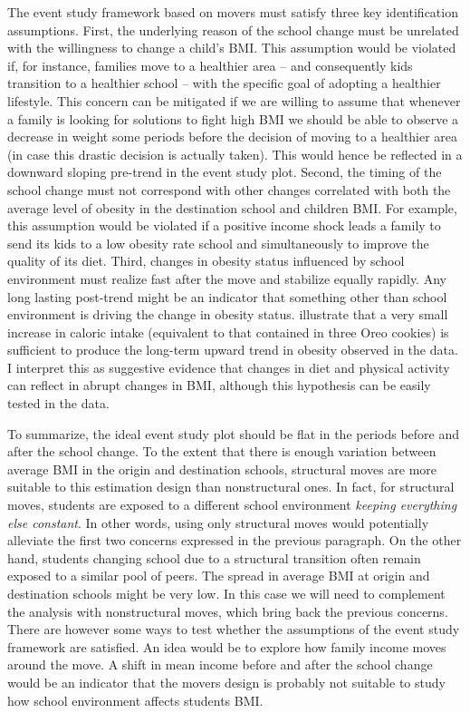 \documentclass[twoside,12pt]{article}
\begin{document}
The event study framework based on movers must satisfy three key identification assumptions. First, the underlying reason of the school change must be unrelated with the willingness to change a child's BMI. This assumption would be violated if, for instance, families move to a healthier area -- and consequently kids transition to a healthier school -- with the specific goal of adopting a healthier lifestyle. This concern can be mitigated if we are willing to assume that whenever a family is looking for solutions to fight high BMI we should be able to observe a decrease in weight some periods before the decision of moving to a healthier area (in case this drastic decision is actually taken). This would hence be reflected in a downward sloping pre-trend in the event study plot. Second, the timing of the school change must not correspond with other changes correlated with both the average level of obesity in the destination school and children BMI. For example, this assumption would be violated if a positive income shock leads a family to send its kids to a low obesity rate school and simultaneously to improve the quality of its diet. Third, changes in obesity status influenced by school environment must realize fast after the move and stabilize equally rapidly. Any long lasting post-trend might be an indicator that something other than school environment is driving the change in obesity status. \cite{cutler2002have} illustrate that a very small increase in caloric intake (equivalent to that contained in three Oreo cookies) is sufficient to produce the long-term upward trend in obesity observed in the data. I interpret this as suggestive evidence that changes in diet and physical activity can reflect in abrupt changes in BMI, although this hypothesis can be easily tested in the data. 

To summarize, the ideal event study plot should be flat in the periods before and after the school change. To the extent that there is enough variation between average BMI in the origin and destination schools, structural moves are more suitable to this estimation design than nonstructural ones. In fact, for structural moves, students are exposed to a different school environment \textit{keeping everything else constant}. In other words, using only structural moves would potentially alleviate the first two concerns expressed in the previous paragraph. On the other hand, students changing school due to a structural transition often remain exposed to a similar pool of peers. The spread in average BMI at origin and destination schools might be very low. In this case we will need to complement the analysis with nonstructural moves, which bring back the previous concerns. There are however some ways to test whether the assumptions of the event study framework are satisfied. An idea would be to explore how family income moves around the move. A shift in mean income before and after the school change would be an indicator that the movers design is probably not suitable to study how school environment affects students BMI. 
\end{document}
